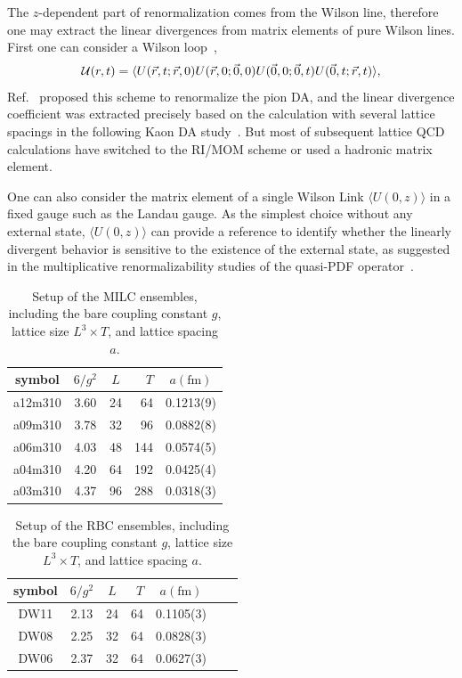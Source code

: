 The $z$-dependent part of renormalization comes from the Wilson line, therefore 
one may extract the linear divergences from matrix elements of pure Wilson lines.
First one can consider a Wilson loop~\cite{Chen:2016fxx,Zhang:2017bzy,Musch:2010ka,Green:2017xeu,Chen:2017gck},
\begin{equation}
{\cal U}(r,t)=\langle U(\vec{r},t;\vec{r},0)U(\vec{r},0;\vec{0},0)U(\vec{0},0;\vec{0},t)U(\vec{0},t;\vec{r},t)\rangle , 
\end{equation}
Ref.~\cite{Chen:2016fxx} proposed this scheme to renormalize the pion DA, and the linear divergence coefficient was extracted precisely based on the calculation with several lattice spacings  in the following Kaon DA study~\cite{Zhang:2017bzy}. But most of subsequent lattice QCD calculations have switched to the RI/MOM scheme or used a hadronic matrix element.

 One can also consider the matrix element of a single Wilson Link $\langle U(0,z)\rangle$ in a fixed gauge such as the Landau gauge. As the simplest choice without any external state, $\langle U(0,z)\rangle$ can provide a reference to identify whether the linearly divergent behavior is sensitive to the existence of the external state, as suggested in the multiplicative renormalizability studies of the quasi-PDF operator~\cite{Ji:2015jwa, Ji:2017oey,Ishikawa:2017faj,Green:2017xeu}.
 
\begin{table}[htbp]
  \centering
  \begin{tabular}{c|ccrc}
  \toprule
 symbol & $6/g^2$ & $L$ & $T$  & $a(\mathrm{fm})$ \\
\hline
a12m310 &  3.60 & 24 & 64  & 0.1213(9) \\
\hline
a09m310 &  3.78 & 32 & 96 & 0.0882(8)  \\
\hline
a06m310 &  4.03 & 48 & 144 & 0.0574(5) \\
\hline
a04m310 &  4.20 & 64 & 192 & 0.0425(4)  \\
\hline
a03m310 &  4.37 & 96 & 288 & 0.0318(3) \\
\hline
  \end{tabular}
  \caption{Setup of the MILC ensembles, including the bare coupling constant $g$, lattice size $L^3\times T$, and lattice spacing $a$.}
  \label{tab:lattice}
\end{table}

\begin{table}[htbp]
  \centering
  \begin{tabular}{c|ccrccc}
  \toprule
 symbol & $6/g^2$ & $L$ & $T$ &  $a(\mathrm{fm})$\\
\hline
DW11 & 2.13 &24 & 64  & 0.1105(3) \\
\hline
DW08 & 2.25 &32 & 64  & 0.0828(3) \\
\hline
DW06 & 2.37 &32 & 64  & 0.0627(3) \\
\hline
  \end{tabular}
  \caption{Setup of the RBC ensembles, including the bare coupling constant $g$, lattice size $L^3\times T$, and lattice spacing $a$.}
  \label{tab:lattice2}
\end{table}


